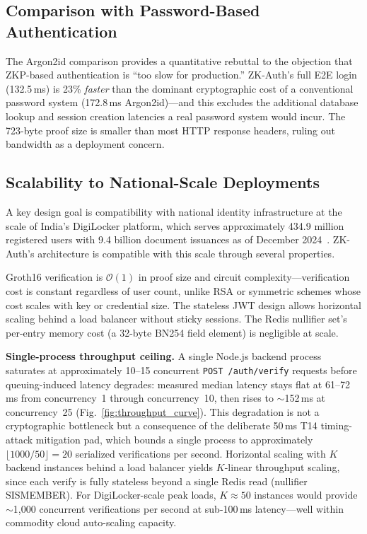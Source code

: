 \documentclass[journal,twoside,10pt]{IEEEtran}
\begin{document}
\subsection{Comparison with Password-Based Authentication}

The Argon2id comparison provides a quantitative rebuttal to the objection
that ZKP-based authentication is ``too slow for production.'' ZK-Auth's
full E2E login (132.5\,ms) is 23\% \textit{faster} than the dominant
cryptographic cost of a conventional password system (172.8\,ms
Argon2id)---and this excludes the additional database lookup and session
creation latencies a real password system would incur. The 723-byte proof
size is smaller than most HTTP response headers, ruling out bandwidth as a
deployment concern.

\subsection{Scalability to National-Scale Deployments}

A key design goal is compatibility with national identity infrastructure at
the scale of India's DigiLocker platform, which serves approximately
434.9 million registered users with 9.4 billion document issuances as of
December 2024~\cite{digilocker}. ZK-Auth's architecture is compatible with
this scale through several properties.

Groth16 verification is $\mathcal{O}(1)$ in proof size and circuit
complexity---verification cost is constant regardless of user count,
unlike RSA or symmetric schemes whose cost scales with key or credential
size. The stateless JWT design allows horizontal scaling behind a load
balancer without sticky sessions. The Redis nullifier set's per-entry
memory cost (a 32-byte BN254 field element) is negligible at scale.

\textbf{Single-process throughput ceiling.} A single Node.js backend
process saturates at approximately 10--15 concurrent
\texttt{POST /auth/verify} requests before queuing-induced latency
degrades: measured median latency stays flat at 61--72\,ms from
concurrency~1 through concurrency~10, then rises to $\sim$152\,ms at
concurrency~25 (Fig.~\ref{fig:throughput_curve}). This degradation is not
a cryptographic bottleneck but a consequence of the deliberate 50\,ms T14
timing-attack mitigation pad, which bounds a single process to
approximately $\lfloor 1000/50 \rfloor = 20$ serialized verifications per
second. Horizontal scaling with $K$ backend instances behind a load
balancer yields $K$-linear throughput scaling, since each verify is fully
stateless beyond a single Redis read (nullifier SISMEMBER). For
DigiLocker-scale peak loads, $K \approx 50$ instances would provide
$\sim$1{,}000 concurrent verifications per second at sub-100\,ms
latency---well within commodity cloud auto-scaling capacity.
\end{document}
